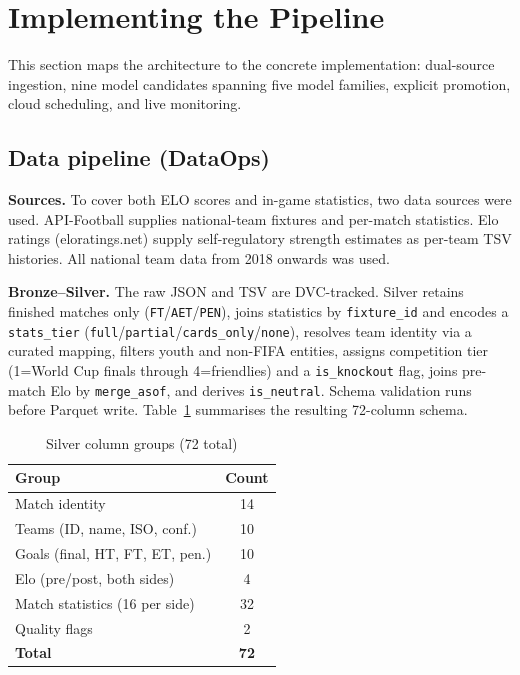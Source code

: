 \documentclass[conference]{IEEEtran}
\begin{document}
\section{Implementing the Pipeline}
\label{sec:implementation}

This section maps the architecture to the concrete implementation: dual-source
ingestion, nine model candidates spanning five model families, explicit 
promotion, cloud scheduling, and live monitoring.

\subsection{Data pipeline (DataOps)}
\label{sec:impl_data}

\textbf{Sources.}
To cover both ELO scores and in-game statistics, two data sources were used. 
API-Football supplies national-team fixtures and per-match statistics.
Elo ratings (eloratings.net) supply self-regulatory strength estimates as
per-team TSV histories.
All national team data from 2018 onwards was used.

\textbf{Bronze--Silver.}
The raw JSON and TSV are DVC-tracked.
Silver retains finished matches only (\texttt{FT}/\texttt{AET}/\texttt{PEN}),
joins statistics by \texttt{fixture\_id} and encodes a
\texttt{stats\_tier} (\texttt{full}/\texttt{partial}/\texttt{cards\_only}/\texttt{none}),
resolves team identity via a curated mapping, filters youth and non-FIFA
entities, assigns competition tier (1=World Cup finals through 4=friendlies)
and a \texttt{is\_knockout} flag, joins pre-match Elo by
\texttt{merge\_asof}, and derives \texttt{is\_neutral}.
Schema validation runs before Parquet write.
Table~\ref{tab:silver_schema} summarises the resulting 72-column schema.

\begin{table}[h]
  \caption{Silver column groups (72 total)}
  \label{tab:silver_schema}
  \begin{tabular}{@{}lc@{}}
    \toprule
    Group & Count \\
    \midrule
    Match identity & 14 \\
    Teams (ID, name, ISO, conf.) & 10 \\
    Goals (final, HT, FT, ET, pen.) & 10 \\
    Elo (pre/post, both sides) & 4 \\
    Match statistics (16 per side) & 32 \\
    Quality flags & 2 \\
    \midrule
  \textbf{Total} & \textbf{72} \\
    \bottomrule
  \end{tabular}
\end{table}
\end{document}
